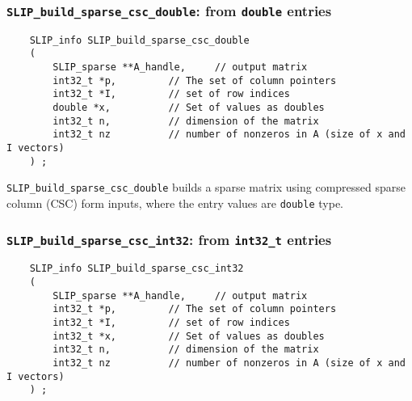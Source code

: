 \documentclass[12pt]{article}
\theoremstyle{definition}
\begin{document}
\cprotect\subsubsection{\verb|SLIP_build_sparse_csc_double|: from \verb|double| entries}
\label{s:user:build_sparse_csc_double}

\begin{mdframed}[userdefinedwidth=6in]
{\footnotesize
\begin{verbatim}
    SLIP_info SLIP_build_sparse_csc_double
    (
        SLIP_sparse **A_handle,     // output matrix
        int32_t *p,         // The set of column pointers
        int32_t *I,         // set of row indices
        double *x,          // Set of values as doubles
        int32_t n,          // dimension of the matrix
        int32_t nz          // number of nonzeros in A (size of x and I vectors)
    ) ;
\end{verbatim}
} \end{mdframed}

\verb|SLIP_build_sparse_csc_double| builds a sparse matrix using compressed
sparse column (CSC) form inputs, where the entry values are \verb|double| type.

\cprotect\subsubsection{\verb|SLIP_build_sparse_csc_int32|: from \verb|int32_t| entries}
\label{s:user:build_sparse_csc_int32}

\begin{mdframed}[userdefinedwidth=6in]
{\footnotesize
\begin{verbatim}
    SLIP_info SLIP_build_sparse_csc_int32
    (
        SLIP_sparse **A_handle,     // output matrix
        int32_t *p,         // The set of column pointers
        int32_t *I,         // set of row indices
        int32_t *x,         // Set of values as doubles
        int32_t n,          // dimension of the matrix
        int32_t nz          // number of nonzeros in A (size of x and I vectors)
    ) ;
\end{verbatim}
} \end{mdframed}
\end{document}
